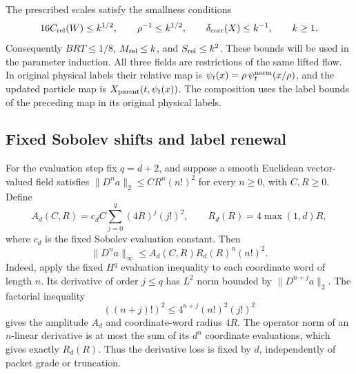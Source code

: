 \documentclass[11pt]{article}
\theoremstyle{definition}
\begin{document}
The prescribed scales satisfy the smallness conditions
\[
 16C_{\rm rel}(W)\leq k^{1/2},\qquad
 \rho^{-1}\leq k^{1/2},\qquad
 \delta_{\rm corr}(X)\leq k^{-1},\qquad k\geq1.
\]
Consequently $BRT\leq1/8$, $M_{\rm rel}\leq k$, and
$S_{\rm rel}\leq k^2$. These bounds will be used in the parameter induction.
All three fields are restrictions of the same lifted flow. In original
physical labels their relative map is
$\psi_t(x)=\rho\,\psi_t^{\rm norm}(x/\rho)$, and the updated
particle map is $X_{\rm parent}(t,\psi_t(x))$. The composition uses the label bounds of the preceding map in its
original physical labels.

\subsection{Fixed Sobolev shifts and label renewal}
For the evaluation step fix $q=d+2$, and suppose a smooth Euclidean
vector-valued field satisfies
$\|D^na\|_2\leq C R^n(n!)^2$ for every $n\geq0$, with $C,R\geq0$.
Define
\[
 A_d(C,R)=c_d C\sum_{j=0}^q(4R)^j(j!)^2,
 \qquad R_d(R)=4\max(1,d)R,
\]
where $c_d$ is the fixed Sobolev evaluation constant. Then
\begin{equation}\label{eq:fixed-sobolev-jet-shift}
 \|D^na\|_\infty\leq A_d(C,R)R_d(R)^n(n!)^2.
\end{equation}
Indeed, apply the fixed $H^q$ evaluation inequality to each coordinate
word of length $n$. Its derivative of order $j\leq q$ has $L^2$ norm
bounded by $\|D^{n+j}a\|_2$. The factorial inequality
\[
 ((n+j)!)^2\leq4^{n+j}(n!)^2(j!)^2
\]
gives the amplitude $A_d$ and coordinate-word radius $4R$.
The operator norm of an $n$-linear derivative is at most the sum of its
$d^n$ coordinate evaluations, which gives exactly $R_d(R)$.
Thus the derivative loss is fixed by $d$, independently of packet grade
or truncation.
\end{document}
